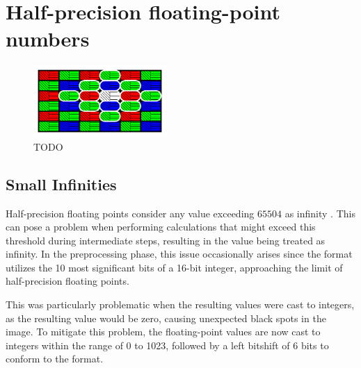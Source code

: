 \section{Half-precision floating-point numbers}





\begin{figure}[H]
    \centering
    \includegraphics[width=0.45\textwidth]{figures/polarized_image/half2_conv.pdf}
    \caption{TODO}
    \label{fig:}
\end{figure}

\subsection{Small Infinities}

Half-precision floating points consider any value exceeding $65504$ as infinity \cite{HalfprecisionFloatingpointFormat2023}. This can pose a problem when performing calculations that might exceed this threshold during intermediate steps, resulting in the value being treated as infinity. In the preprocessing phase, this issue occasionally arises since the  format utilizes the 10 most significant bits of a 16-bit integer, approaching the limit of half-precision floating points.

This was particularly problematic when the resulting values were cast to integers, as the resulting value would be zero, causing unexpected black spots in the image.
To mitigate this problem, the floating-point values are now cast to integers within the range of 0 to 1023, followed by a left bitshift of 6 bits to conform to the  format.


